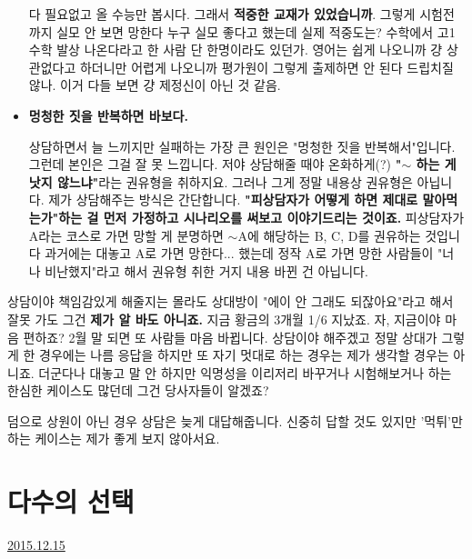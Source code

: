 \begin{itemize}
    다 필요없고 올 수능만 봅시다. 그래서 \textbf{적중한 교재가 있었습니까}.
    그렇게 시험전까지 실모 안 보면 망한다 누구 실모 좋다고 했는데 실제 적중도는?
    수학에서 고1수학 발상 나온다라고 한 사람 단 한명이라도 있던가.
    영어는 쉽게 나오니까 걍 상관없다고 하더니만 어렵게 나오니까 평가원이 그렇게 출제하면 안 된다 드립치질 않나.
    이거 다들 보면 걍 제정신이 아닌 것 같음.
    \vspace{5mm}

    \item \textbf{멍청한 짓을 반복하면 바보다.}
    \vspace{5mm}

    상담하면서 늘 느끼지만 실패하는 가장 큰 원인은 "멍청한 짓을 반복해서"입니다.
    그런데 본인은 그걸 잘 못 느낍니다.
    저야 상담해줄 때야 온화하게(?) \textbf{"$\sim$ 하는 게 낫지 않느냐"}라는 권유형을 취하지요.
    그러나 그게 정말 내용상 권유형은 아닙니다. 제가 상담해주는 방식은 간단합니다.
    \textbf{"피상담자가 어떻게 하면 제대로 말아먹는가"하는 걸 먼저 가정하고 시나리오를 써보고 이야기드리는 것이죠.}
    피상담자가 A라는 코스로 가면 망할 게 분명하면 $\sim$A에 해당하는 B, C, D를 권유하는 것입니다
    과거에는 대놓고 A로 가면 망한다... 했는데 정작 A로 가면 망한 사람들이 "너 나 비난했지"라고 해서 권유형 취한 거지 내용 바뀐 건 아닙니다.
    \vspace{5mm}

\end{itemize}

상담이야 책임감있게 해줄지는 몰라도 상대방이 "에이 안 그래도 되잖아요"라고 해서 잘못 가도 그건 \textbf{제가 알 바도 아니죠.}
지금 황금의 3개월 1/6 지났죠. 자, 지금이야 마음 편하죠? 2월 말 되면 또 사람들 마음 바뀝니다.
상담이야 해주겠고 정말 상대가 그렇게 한 경우에는 나름 응답을 하지만 또 자기 멋대로 하는 경우는 제가 생각할 경우는 아니죠.
더군다나 대놓고 말 안 하지만 익명성을 이리저리 바꾸거나 시험해보거나 하는 한심한 케이스도 많던데 그건 당사자들이 알겠죠?
\vspace{5mm}

덤으로 상원이 아닌 경우 상담은 늦게 대답해줍니다.
신중히 답할 것도 있지만 '먹튀'만 하는 케이스는 제가 좋게 보지 않아서요.
\vspace{5mm}






\section{다수의 선택}
\href{https://www.kockoc.com/Apoc/545560}{2015.12.15}

